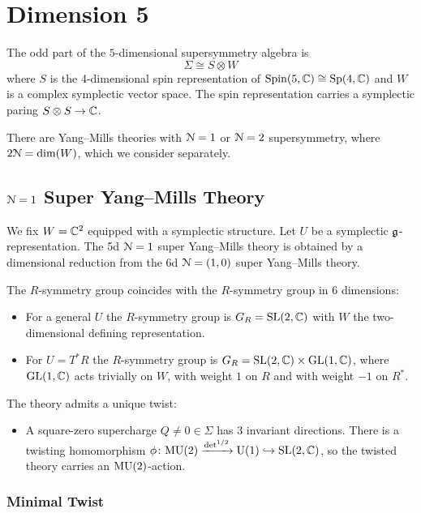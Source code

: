 \documentclass[10pt, oneside]{article}
\begin{document}
\section{Dimension 5}

The odd part of the $5$-dimensional supersymmetry algebra is 
\[
\Sigma\cong S\otimes W
\]
where $S$ is the 4-dimensional spin representation of $\mathrm{Spin}(5, \mathbb C)\cong \mathrm{Sp}(4, \mathbb C)$ and $W$ is a complex symplectic vector space. 
The spin representation carries a symplectic paring $S\otimes S\rightarrow \mathbb C$.

There are Yang--Mills theories with $\mathcal N=1$ or $\mathcal N=2$ supersymmetry, where $2 \mathcal N = \dim(W)$, which we consider separately.

\subsection{\texorpdfstring{$\mathcal{N} = 1$}{N=1} Super Yang--Mills Theory}
\label{5d_1_section}

We fix $W = \mathbb C^2$ equipped with a symplectic structure. Let $U$ be a symplectic $\mathfrak g$-representation. The 5d $\mathcal N=1$ super Yang--Mills theory is obtained by a dimensional reduction from the 6d $\mathcal N=(1, 0)$ super Yang--Mills theory.

The $R$-symmetry group coincides with the $R$-symmetry group in 6 dimensions:
\begin{itemize}
\item For a general $U$ the $R$-symmetry group is $G_R=\mathrm{SL}(2, \mathbb C)$ with $W$ the two-dimensional defining representation.

\item For $U=T^* R$ the $R$-symmetry group is $G_R=\mathrm{SL}(2, \mathbb C)\times \mathrm{GL}(1, \mathbb C)$, where $\mathrm{GL}(1, \mathbb C)$ acts trivially on $W$, with weight $1$ on $R$ and with weight $-1$ on $R^*$.
\end{itemize}

The theory admits a unique twist:
\begin{itemize}
\item A square-zero supercharge $Q\neq 0\in\Sigma$ has 3 invariant directions. There is a twisting homomorphism $\phi\colon \mathrm{MU}(2)\xrightarrow{\det^{1/2}}\mathrm{U}(1)\hookrightarrow \mathrm{SL}(2, \mathbb C)$, so the twisted theory carries an $\mathrm{MU}(2)$-action.
\end{itemize}

\subsubsection{Minimal Twist}
\label{sect:5d1minimaltwist}
\end{document}
